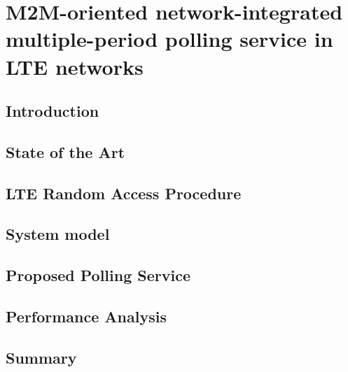 \chapter{M2M-oriented network-integrated multiple-period polling service in LTE networks}

\ifpdf
    \graphicspath{{Chapter6/Figs/Raster/}{Chapter6/Figs/PDF/}{Chapter3/Figs/}}
\else
    \graphicspath{{Chapte6/Figs/Vector/}{Chapter6/Figs/}}
\fi

\section{Introduction}

\section{State of the Art}

\section{LTE Random Access Procedure}

\section{System model}

\section{Proposed Polling Service}

\section{Performance Analysis}

\section{Summary}




